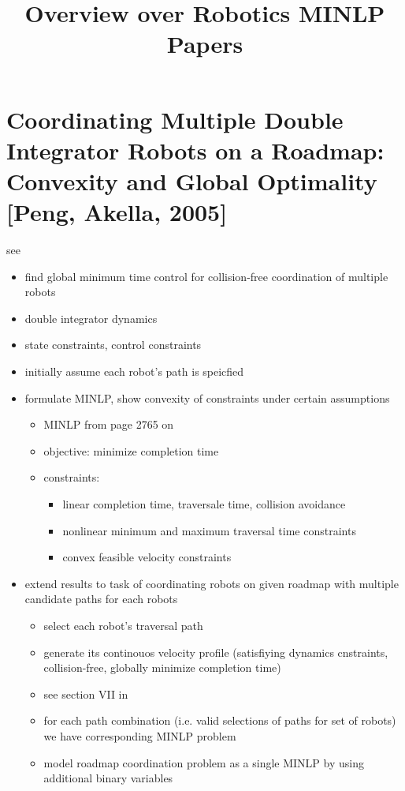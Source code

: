 \documentclass{article}
\title{\textbf{Overview over Robotics MINLP Papers}}
\date{}
\begin{document}
\maketitle

\section{Coordinating Multiple Double Integrator Robots on a Roadmap: Convexity and Global Optimality [Peng, Akella, 2005]}
see \cite{peng2005coordinating}
\begin{itemize}
\item find global minimum time control for collision-free coordination of multiple robots
\item double integrator dynamics
\item state constraints, control constraints
\item initially assume each robot's path is speicfied
\item formulate MINLP, show convexity of constraints under certain assumptions
	\begin{itemize}
	\item MINLP from page 2765 on
	\item objective: minimize completion time
	\item constraints: 
		\begin{itemize}
		\item linear completion time, traversale time, collision avoidance
		\item nonlinear minimum and maximum traversal time constraints
		\item convex feasible velocity constraints
		\end{itemize}				
	\end{itemize}
\item extend results to task of coordinating robots on given roadmap with multiple candidate paths for each robots
	\begin{itemize}
	\item select each robot's traversal path
	\item generate its continouos velocity profile (satisfiying dynamics cnstraints, collision-free, globally minimize completion time)
	\item see section VII in \cite{peng2005coordinating}
	\item for each path combination (i.e. valid selections of paths for set of robots) we have corresponding MINLP problem
	\item model roadmap coordination problem as a single MINLP by using additional binary variables
	\end{itemize}
\end{itemize}


{}

\end{document}
